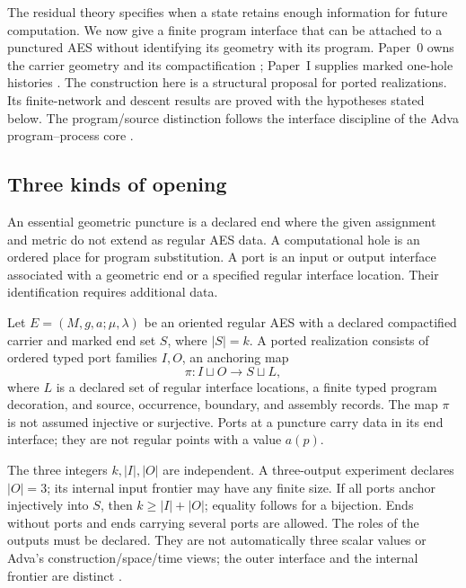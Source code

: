 The residual theory specifies when a state retains enough information for
future computation.  We now give a finite program interface that can be
attached to a punctured AES without identifying its geometry with its program.
Paper~0 owns the carrier geometry and its compactification
\cite{Yuan2026AEGPaperZero}; Paper~I supplies marked one-hole histories
\cite{Yuan2026AEGFoundations}.  The construction here is a structural proposal
for ported realizations.  Its finite-network and descent results are proved
with the hypotheses stated below.  The program/source distinction follows the
interface discipline of the Adva program--process core
\cite{Yuan2026AdvaProgramProcessCore}.

\subsection{Three kinds of opening}

An essential geometric puncture is a declared end where the given assignment
and metric do not extend as regular AES data.  A computational hole is an
ordered place for program substitution.  A port is an input or output interface
associated with a geometric end or a specified regular interface location.
Their identification requires additional data.

\begin{definition}
\label{def:ported-aes-realization}
Let $E=(M,g,a;\mu,\lambda)$ be an oriented regular AES with a declared
compactified carrier and marked end set $S$, where $|S|=k$.  A ported
realization consists of ordered typed port families $I,O$, an anchoring map
\[
  \pi:I\sqcup O\longrightarrow S\sqcup L,
\]
where $L$ is a declared set of regular interface locations, a finite typed
program decoration, and source, occurrence, boundary, and assembly records.
The map $\pi$ is not assumed injective or surjective.  Ports at a puncture carry
data in its end interface; they are not regular points with a value $a(p)$.
\end{definition}

The three integers $k,|I|,|O|$ are independent.  A three-output experiment
declares $|O|=3$; its internal input frontier may have any finite size.  If all
ports anchor injectively into $S$, then $k\ge |I|+|O|$; equality follows for a
bijection.  Ends without ports and ends carrying several ports are allowed.
The roles of the outputs must be declared.  They are not automatically three
scalar values or Adva's construction/space/time views; the outer interface and
the internal frontier are distinct \cite{Yuan2026AdvaTriadicFrontiers}.

